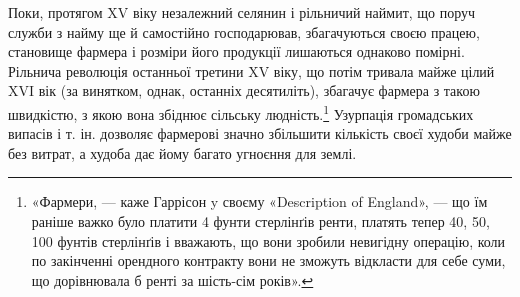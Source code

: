 Поки, протягом XV віку незалежний селянин і рільничий
наймит, що поруч служби з найму ще й самостійно господарював,
збагачуються своєю працею, становище фармера і розміри його
продукції лишаються однаково помірні. Рільнича революція
останньої третини XV віку, що потім тривала майже цілий XVI вік
(за винятком, однак, останніх десятиліть), збагачує фармера з
такою швидкістю, з якою вона збіднює сільську людність.\footnote{
«Фармери, — каже Гаррісон y своєму «Description of England», —
що їм раніше важко було платити 4 фунти стерлінґів ренти, платять тепер 40, 50, 100 фунтів стерлінґів і вважають, що вони зробили невигідну операцію,
коли по закінченні орендного контракту вони не зможуть відкласти
для себе суми, що дорівнювала б ренті за шість-сім років».
}
Узурпація громадських випасів і т. ін. дозволяє фармерові значно
збільшити кількість своєї худоби майже без витрат, а худоба дає
йому багато угноєння для землі.

